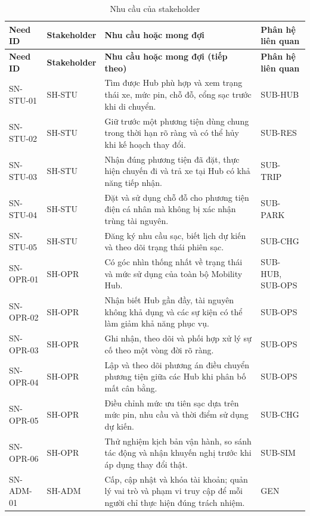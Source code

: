 \begingroup
\small
\begin{longtable}{|L{23mm}|L{27mm}|L{65mm}|L{24mm}|}
  \caption{Nhu cầu của stakeholder}\label{tab:stakeholder-needs}\\
  \hline
  \textbf{Need ID} & \textbf{Stakeholder} & \centering\arraybackslash\textbf{Nhu cầu hoặc mong đợi} & \textbf{Phân hệ liên quan}\\
  \hline
  \endfirsthead
  \hline
  \textbf{Need ID} & \textbf{Stakeholder} & \centering\arraybackslash\textbf{Nhu cầu hoặc mong đợi (tiếp theo)} & \textbf{Phân hệ liên quan}\\
  \hline
  \endhead
  SN-STU-01 & SH-STU & Tìm được Hub phù hợp và xem trạng thái xe, mức pin, chỗ đỗ, cổng sạc trước khi di chuyển. & SUB-HUB\\
  \hline
  SN-STU-02 & SH-STU & Giữ trước một phương tiện dùng chung trong thời hạn rõ ràng và có thể hủy khi kế hoạch thay đổi. & SUB-RES\\
  \hline
  SN-STU-03 & SH-STU & Nhận đúng phương tiện đã đặt, thực hiện chuyến đi và trả xe tại Hub có khả năng tiếp nhận. & SUB-TRIP\\
  \hline
  SN-STU-04 & SH-STU & Đặt và sử dụng chỗ đỗ cho phương tiện điện cá nhân mà không bị xác nhận trùng tài nguyên. & SUB-PARK\\
  \hline
  SN-STU-05 & SH-STU & Đăng ký nhu cầu sạc, biết lịch dự kiến và theo dõi trạng thái phiên sạc. & SUB-CHG\\
  \hline
  SN-OPR-01 & SH-OPR & Có góc nhìn thống nhất về trạng thái và mức sử dụng của toàn bộ Mobility Hub. & SUB-HUB, SUB-OPS\\
  \hline
  SN-OPR-02 & SH-OPR & Nhận biết Hub gần đầy, tài nguyên không khả dụng và các sự kiện có thể làm giảm khả năng phục vụ. & SUB-OPS\\
  \hline
  SN-OPR-03 & SH-OPR & Ghi nhận, theo dõi và phối hợp xử lý sự cố theo một vòng đời rõ ràng. & SUB-OPS\\
  \hline
  SN-OPR-04 & SH-OPR & Lập và theo dõi phương án điều chuyển phương tiện giữa các Hub khi phân bố mất cân bằng. & SUB-OPS\\
  \hline
  SN-OPR-05 & SH-OPR & Điều chỉnh mức ưu tiên sạc dựa trên mức pin, nhu cầu và thời điểm sử dụng dự kiến. & SUB-CHG\\
  \hline
  SN-OPR-06 & SH-OPR & Thử nghiệm kịch bản vận hành, so sánh tác động và nhận khuyến nghị trước khi áp dụng thay đổi thật. & SUB-SIM\\
  \hline
  SN-ADM-01 & SH-ADM & Cấp, cập nhật và khóa tài khoản; quản lý vai trò và phạm vi truy cập để mỗi người chỉ thực hiện đúng trách nhiệm. & GEN\\

\end{longtable}
